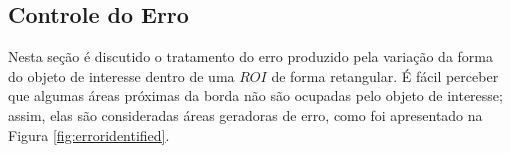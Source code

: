 \subsection{Controle do Erro}

Nesta seção é discutido o tratamento do erro produzido pela variação da forma do objeto de interesse dentro de uma
$ROI$ de forma retangular. É fácil perceber que algumas áreas próximas da borda não são ocupadas pelo objeto de interesse;
assim, elas são consideradas áreas geradoras de erro, como foi apresentado na Figura \ref{fig:erroridentified}.

